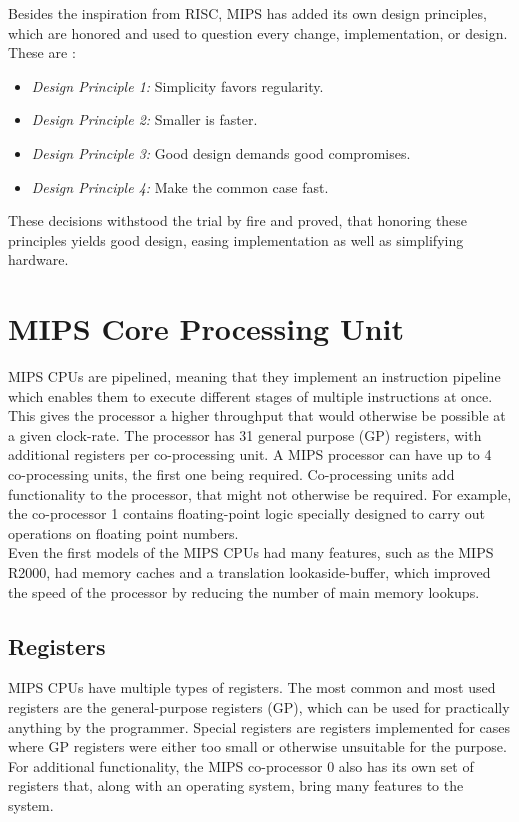 Besides the inspiration from RISC, MIPS has added its own design principles,
which are honored and used to question every change, implementation,
or design.
These are \cite{COD5}:
\begin{itemize}
	\item \textit{Design Principle 1:} Simplicity favors regularity.
	\item \textit{Design Principle 2:} Smaller is faster.
	\item \textit{Design Principle 3:} Good design demands good
	compromises.
	\item \textit{Design Principle 4:} Make the common case fast.
\end{itemize}
These decisions withstood the trial by fire and proved, that honoring these
principles yields good design, easing implementation as well as simplifying
hardware\cite{COD5}.


\section{MIPS Core Processing Unit}
MIPS CPUs are pipelined, meaning that they implement an instruction pipeline which
enables them
to execute different stages of multiple instructions at once. This gives the
processor a higher throughput that would otherwise be possible at a given
clock-rate. The processor has 31 general purpose (GP) registers, with
additional registers per co-processing unit. A MIPS processor can have up to
4 co-processing units, the first one being required. Co-processing units add
functionality to the processor, that might not otherwise be required. For
example, the co-processor 1 contains floating-point logic specially
designed to carry out operations on floating point numbers.\\
Even the first models of the MIPS CPUs had many features, such as the
MIPS R2000, had memory caches and a translation lookaside-buffer, which
improved the speed of the processor by reducing the number of main memory lookups.

\subsection{Registers}
MIPS CPUs have multiple types of registers. The most common and most used
registers are the general-purpose registers (GP), which can be used for
practically anything by the programmer. Special registers are registers
implemented for cases where GP registers were either too small or otherwise
unsuitable for the purpose.\\
For additional functionality, the MIPS co-processor 0 also has its own set of
registers that, along with an operating system, bring many features to the
system.

